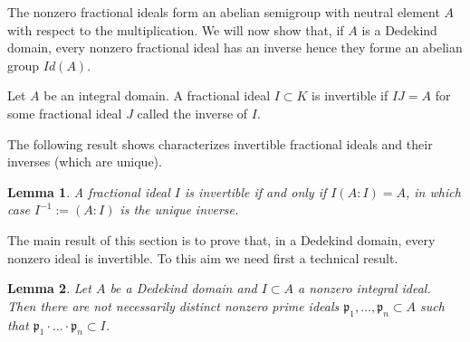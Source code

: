 \documentclass[a4paper]{book}
\theoremstyle{break}
\theoremstyle{plain}
\newtheorem{lemma}{Lemma}[definition]
\begin{document}
The nonzero fractional ideals form an abelian semigroup with neutral element \(A\) with respect to the multiplication. We will now show that, if \(A\) is a Dedekind domain, every nonzero fractional ideal has an inverse hence they forme an abelian group \(Id (A)\).

\begin{definition}
    Let \(A\) be an {\color{mathif}integral domain}. A {\color{mathif}fractional ideal} \(I \subset K\) is {\color{maththen}invertible} if \(IJ = A\) for some fractional ideal \(J\) called the {\color{mathrem}inverse} of \(I\).
\end{definition}

The following result shows characterizes invertible fractional ideals and their inverses (which are unique).

\begin{lemma}
    A fractional ideal \(I\) is invertible if and only if \(I (A : I) = A\), in which case \(I^{-1} := (A : I)\) is the unique inverse.
\end{lemma}


The main result of this section is to prove that, in a Dedekind domain, every nonzero ideal is invertible. To this aim we need first a technical result.

\begin{lemma}
    Let \(A\) be a {\color{mathif}Dedekind domain} and \(I \subset A\) a {\color{mathif}nonzero integral ideal}. Then there are not necessarily distinct {\color{maththen}nonzero prime ideals} \(\mathfrak{p}_1, \dots, \mathfrak{p}_n \subset A\) such that \(\mathfrak{p}_1 \cdot \dots \cdot \mathfrak{p}_n \subset I\).
\end{lemma}
\end{document}
